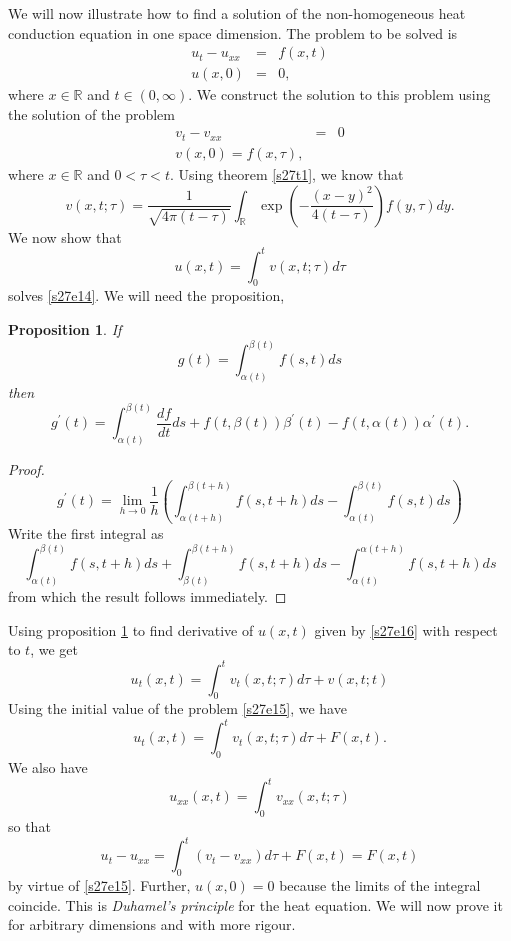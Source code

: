 \documentclass{article}
\newcommand{\td}[2]{\frac{d{#1}}{d{#2}}}
\theoremstyle{plain}
\numberwithin{thm}{section}
\theoremstyle{plain}
\newtheorem{prop}{Proposition}
\numberwithin{prop}{section}
\theoremstyle{definition}
\numberwithin{defn}{section}
\theoremstyle{remark}
\numberwithin{equation}{section}
\begin{document}
We will now illustrate how to find a solution of the non-homogeneous heat conduction equation in one space
dimension. The problem to be solved is
\begin{eqnarray}
u_t - u_{xx} &=& f(x, t) \label{s27e14} \\
u(x, 0) &=& 0 \nonumber,
\end{eqnarray}
where $x \in \mathbb{R}$ and $t \in (0, \infty)$. We construct the solution to this problem using the solution
of the problem
\begin{eqnarray}
v_t - v_{xx} &=& 0 \label{s27e15} \\
v(x, 0) = f(x, \tau) \nonumber,
\end{eqnarray}
where $x \in \mathbb{R}$ and $0 < \tau < t$. Using theorem \ref{s27t1}, we know that
\[
v(x, t; \tau) = 
\frac{1}{\sqrt{4\pi(t - \tau)}}\int_{\mathbb{R}}\exp\left(-\frac{(x - y)^2}{4(t - \tau)}\right)f(y, \tau)dy.
\]
We now show that
\begin{equation}\label{s27e16}
u(x, t) = \int_0^t v(x, t; \tau) d\tau
\end{equation}
solves \eqref{s27e14}. We will need the proposition,
\begin{prop}\label{s27p3} If
\[
g(t) = \int_{\alpha(t)}^{\beta(t)} f(s, t)ds
\]
then
\[
g^\prime(t) = \int_{\alpha(t)}^{\beta(t)} \td{f}{t}ds + f(t, \beta(t))\beta^\prime(t) - 
f(t, \alpha(t))\alpha^\prime(t).
\]
\end{prop}
\begin{proof}
\[
g^\prime(t) = \lim_{h \rightarrow 0}\frac{1}{h}
\left(\int_{\alpha(t+h)}^{\beta(t+h)} f(s, t+h)ds - \int_{\alpha(t)}^{\beta(t)} f(s, t)ds\right)
\]
Write the first integral as 
\[
\int_{\alpha(t)}^{\beta(t)} f(s, t+h)ds + \int_{\beta(t)}^{\beta(t+h)} f(s, t+h)ds - 
\int_{\alpha(t)}^{\alpha(t+h)} f(s, t+h)ds
\]
from which the result follows immediately.
\end{proof}
Using proposition \ref{s27p3} to find derivative of $u(x, t)$ given by \eqref{s27e16} with respect to $t$, we get
\[
u_t(x, t) = \int_0^t v_t(x, t; \tau) d\tau + v(x, t; t)
\]
Using the initial value of the problem \eqref{s27e15}, we have
\begin{equation}\label{s27e17}
u_t(x, t) = \int_0^t v_t(x, t; \tau) d\tau + F(x, t).
\end{equation}
We also have
\[
u_{xx}(x, t) = \int_0^t v_{xx}(x, t; \tau)
\]
so that
\[
u_t - u_{xx} = \int_0^t(v_t- v_{xx})d\tau + F(x,t) = F(x, t)
\]
by virtue of \eqref{s27e15}. Further, $u(x, 0) = 0$ because the limits of the integral coincide. This is 
\emph{Duhamel's principle} for the heat equation. We will now prove it for arbitrary dimensions and with more
rigour.
\end{document}
